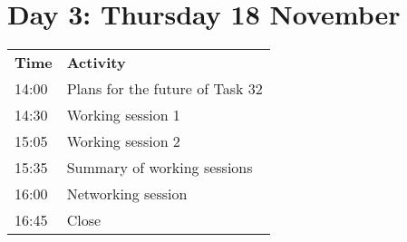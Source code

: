 \section{Day 3: Thursday 18 November}

\bgroup
\begin{table}[!h]
    \centering
    \begin{tabular}{@{}
        |p{}
        |p{}
        |@{}}
    \rowcolor{Task32Blue2} \textbf{Time} & \textbf{Activity} \\  
    14:00 & Plans for the future of Task 32\\
    14:30 & Working session 1 \\
    15:05 & Working session 2 \\
    15:35 & Summary of working sessions \\
    16:00 & Networking session \\
    16:45 & Close
    \end{tabular}
    \label{tab:day3-agenda}
\end{table}
\egroup